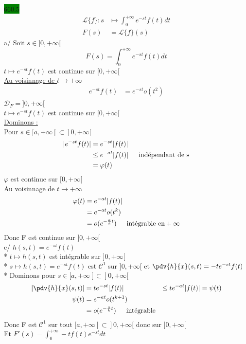 \documentclass{article}
\begin{document}
\noindent \colorbox{green}{660.5}\\
\begin{align*}
  \mathcal{L} \{f\}: s&\mapsto \int_{0}^{+\infty}e^{-s t}f(t)dt \\
  F(s) &= \mathcal{L}\{f\}(s)
\end{align*}
a/ Soit \(s \in ]0, +\infty[\) 
\begin{equation*}
  F(s) = \int_{0}^{+\infty}e^{-s t}f(t)dt
\end{equation*}
\(t \mapsto e^{-st}f(t)\) est continue sur \([0, +\infty[\)\\
\underline{Au voisinnage de \(t \to +\infty\)}
\begin{align*}
  e^{-st }f(t) &= e^{-st}o(t^{2})
\end{align*}
\(\mathcal{D}_{F} = ]0, +\infty[\)\\ 
\(t \mapsto e^{-s t}f(t)\) est continue sur \([0, +\infty[\)\\ 
\underline{Dominons : }\\ 
Pour \(s \in [a, +\infty[ \subset ]0, +\infty[\)
\begin{align*}
  |e^{-s t}f(t)| &= e^{-s t}|f(t)|\\ 
                 &\leq e^{-a t}|f(t)| \indent \text{indépendant de s}\\ 
                 &= \varphi(t)
\end{align*}
\(\varphi\) est continue sur \([0, +\infty[\)\\ 
Au voisinnage de \(t \to +\infty\)
\begin{align*}
  \varphi(t)&= e^{-at}|f(t)| \\
            &= e^{-at}o(t^{k})\\ 
            &= o(e^{-\frac{a}{k}t}) \indent \text{intégrable en} +\infty
\end{align*}
Donc F est continue sur \(]0, +\infty[\)\\ 
c/ \(h(s, t) = e^{-st}f(t)\)\\ 
* \(t \mapsto h(s,t)\) est intégrable sur \(]0, +\infty[\)\\ 
* \(s \mapsto h(s,t) = e^{-s t}f(t)\) est \(\mathcal{C}^{1}\) sur \(]0, +\infty[\)
et \(\pdv{h}{x}(s,t) = -te^{-s t}f(t)\)\\ 
* Dominons pour \(s \in [a, +\infty[ \subset ]0, +\infty[\) 
\begin{align*}
  |\pdv{h}{x}(s,t)| &= te^{-s t}|f(t)| 
                    &\leq t e^{- a t}|f(t)| = \psi(t)\\ 
  \psi(t) &= e^{- a t}o(t^{k+1})\\ 
          &= o(e^{-\frac{a}{k}t}) \indent \text{intégrable}
\end{align*}
Donc F est \(\mathcal{C}^{1}\) sur tout \([a, +\infty[ \subset]0, +\infty[\)
donc sur \(]0, +\infty[\)\\ 
Et \(F'(s) = \int_{0}^{+\infty}-t f(t) e^{-s t}dt \)
\end{document}
